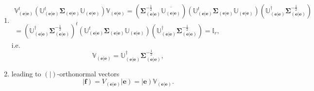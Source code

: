 \documentclass[aps,preprint]{revtex4}%
\begin{document}
\begin{enumerate}
\item
\begin{gather}
\mathbb{V}_{\left(  \left.  \mathbf{e}\right\vert \mathbf{e}\right)  }%
^{t}\left(  \mathbb{U}_{\left(  \left.  \mathbf{e}\right\vert \mathbf{e}%
\right)  }^{t}\mathbf{\Sigma}_{\left(  \left.  \mathbf{e}\right\vert
\mathbf{e}\right)  }\mathbb{U}_{\left(  \left.  \mathbf{e}\right\vert
\mathbf{e}\right)  }\right)  \mathbb{V}_{\left(  \left.  \mathbf{e}\right\vert
\mathbf{e}\right)  }=\left(  \mathbf{\Sigma}_{\left(  \left.  \mathbf{e}%
\right\vert \mathbf{e}\right)  }^{-\frac{1}{2}}\overline{\mathbb{U}_{\left(
\left.  \mathbf{e}\right\vert \mathbf{e}\right)  }}\right)  \left(
\mathbb{U}_{\left(  \left.  \mathbf{e}\right\vert \mathbf{e}\right)  }%
^{t}\mathbf{\Sigma}_{\left(  \left.  \mathbf{e}\right\vert \mathbf{e}\right)
}\mathbb{U}_{\left(  \left.  \mathbf{e}\right\vert \mathbf{e}\right)
}\right)  \left(  \mathbb{U}_{\left(  \left.  \mathbf{e}\right\vert
\mathbf{e}\right)  }^{\dagger}\mathbf{\Sigma}_{\left(  \left.  \mathbf{e}%
\right\vert \mathbf{e}\right)  }^{-\frac{1}{2}}\right) \\
=\left(  \mathbb{U}_{\left(  \left.  \mathbf{e}\right\vert \mathbf{e}\right)
}^{\dagger}\mathbf{\Sigma}_{\left(  \left.  \mathbf{e}\right\vert
\mathbf{e}\right)  }^{-\frac{1}{2}}\right)  ^{t}\left(  \mathbb{U}_{\left(
\left.  \mathbf{e}\right\vert \mathbf{e}\right)  }^{t}\mathbf{\Sigma}_{\left(
\left.  \mathbf{e}\right\vert \mathbf{e}\right)  }\mathbb{U}_{\left(  \left.
\mathbf{e}\right\vert \mathbf{e}\right)  }\right)  \left(  \mathbb{U}_{\left(
\left.  \mathbf{e}\right\vert \mathbf{e}\right)  }^{\dagger}\mathbf{\Sigma
}_{\left(  \left.  \mathbf{e}\right\vert \mathbf{e}\right)  }^{-\frac{1}{2}%
}\right)  =\mathbb{I}_{r},
\end{gather}
i.e.
\begin{equation}
\mathbb{V}_{\left(  \left.  \mathbf{e}\right\vert \mathbf{e}\right)
}=\mathbb{U}_{\left(  \left.  \mathbf{e}\right\vert \mathbf{e}\right)
}^{\dagger}\mathbf{\Sigma}_{\left(  \left.  \mathbf{e}\right\vert
\mathbf{e}\right)  }^{-\frac{1}{2}},
\end{equation}


\item leading to $\left(  \left.  {}\right\vert \right)  $-orthonormal vectors%
\begin{equation}
\left\vert \mathbf{f}\right)  =V_{\left(  \left.  \mathbf{e}\right\vert
\mathbf{e}\right)  }\left\vert \mathbf{e}\right)  =\left\vert \mathbf{e}%
\right)  \mathbb{V}_{\left(  \left.  \mathbf{e}\right\vert \mathbf{e}\right)
}.
\end{equation}



\end{enumerate}
\end{document}
